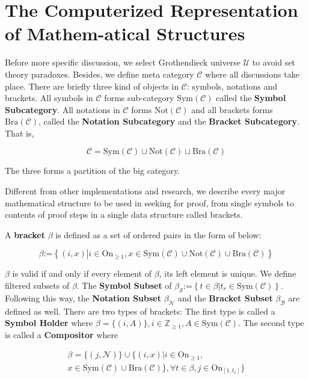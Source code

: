 \documentclass[preprint]{elsarticle}
\numberwithin{theorem}{section}	%
\numberwithin{axiom}{section}	%
\numberwithin{definition}{section}	%
\begin{document}
\section{The Computerized Representation of Mathem-atical Structures}

Before more specific discussion, we select Grothendieck universe \(\mathcal{U}\) \cite{Li2019} to avoid set theory paradoxes. Besides, we define meta category \(\mathcal{C}\) where all discussions take place. There are briefly three kind of objects in \(\mathcal{C}\): symbols, notations and brackets. All symbols in \(\mathcal{C}\) forms sub-category \(\text{Sym}(\mathcal{C})\) called the \textbf{ Symbol Subcategory}. All notations in \(\mathcal{C}\) forms \(\text{Not}(\mathcal{C})\) and all brackets forms \(\text{Bra}(\mathcal{C})\), called the \textbf{ Notation Subcategory} and the \textbf{ Bracket Subcategory}. That is,

\begin{equation}
	\mathcal{C}=\text{Sym}(\mathcal{C})\sqcup \text{Not}(\mathcal{C})\sqcup \text{Bra}(\mathcal{C})
\end{equation}

The three forms a partition of the big category.

Different from other implementations and research, we describe every major mathematical structure to be used in seeking for proof, from single symbols to contents of proof steps in a single data structure called brackets.

\begin{definition}
	A \textbf{ bracket} \(\beta\) is defined as a set of ordered pairs in the form of below:
	
	\begin{equation}
		\beta \text{:=}\left\{(i,x)\left|i\in \text{On}_{\geq 1}\right.,x\in \text{Sym}(\mathcal{C})\cup \text{Not}(\mathcal{C})\cup \text{Bra}(\mathcal{C})\right\}
	\end{equation}
	
	\(\beta\) is valid if and only if every element of \(\beta\), its left element is unique. We define filtered subsets of \(\beta\). The \textbf{ Symbol Subset} of \(\beta _{\mathcal{S}}\text{:=}\left\{t\in \beta \left|t_{\mathit{r}}\in \text{Sym}(\mathcal{C})\right.\right\}\). Following this way, the \textbf{ Notation Subset} \(\beta _{\mathcal{N}}\) and the \textbf{ Bracket Subset} \(\beta _{\mathcal{B}}\) are defined as well. There are two types of brackets: The first type is called a \textbf{ Symbol Holder} where \(\beta =\{(i,A)\},i\in \mathbb{Z}_{\geq 1},A\in \text{Sym}(\mathcal{C})\). The second type is called a \textbf{ Compositor} where
	
	\begin{equation}
	\begin{split}
		\beta =\{(j,\mathcal{N})\}\cup \{(i,x)|i\in \text{On}_{\geq 1},\\ x\in \text{Sym}(\mathcal{C})\cup \text{Bra}(\mathcal{C})\},\forall
		t\in \beta ,j\in \text{On}_{[1,t_{\ell }]}\}
	\end{split}
	\end{equation}
\end{definition}
\end{document}
